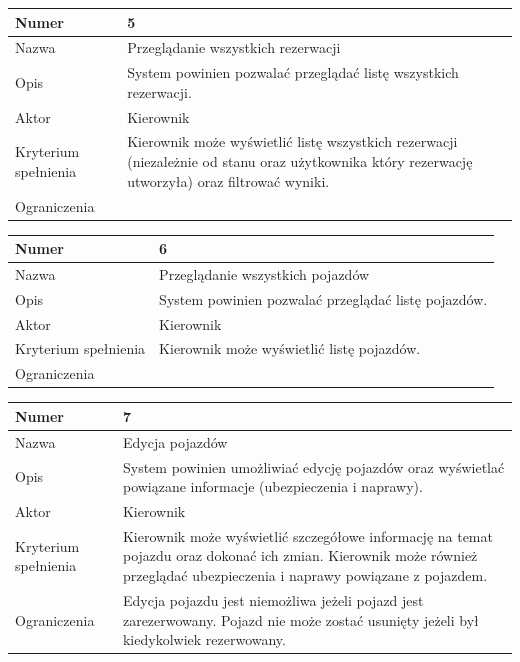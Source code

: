 \documentclass[eng,printmode,openany]{mgr}
\begin{document}
	\begin{table}[H]
		\begin{tabularx}{\textwidth}{|l|X|}
			\hline
			Numer                & 5  \\ \hline
			Nazwa                & Przeglądanie wszystkich rezerwacji \\ \hline
			Opis                 & System powinien pozwalać przeglądać listę wszystkich rezerwacji. \\ \hline
			Aktor                & Kierownik \\ \hline
			Kryterium spełnienia & Kierownik może wyświetlić listę wszystkich rezerwacji (niezależnie od stanu oraz użytkownika który rezerwację utworzyła) oraz filtrować wyniki. \\ \hline
			Ograniczenia         &  \\ \hline
		\end{tabularx}
	\end{table}	

	\begin{table}[H]
		\begin{tabularx}{\textwidth}{|l|X|}
			\hline
			Numer                & 6  \\ \hline
			Nazwa                & Przeglądanie wszystkich pojazdów \\ \hline
			Opis                 & System powinien pozwalać przeglądać listę pojazdów. \\ \hline
			Aktor                & Kierownik \\ \hline
			Kryterium spełnienia & Kierownik może wyświetlić listę pojazdów. \\ \hline
			Ograniczenia         &  \\ \hline
		\end{tabularx}
	\end{table}	

	\begin{table}[H]
		\begin{tabularx}{\textwidth}{|l|X|}
			\hline
			Numer                & 7  \\ \hline
			Nazwa                & Edycja pojazdów \\ \hline
			Opis                 & System powinien umożliwiać edycję pojazdów oraz wyświetlać powiązane informacje (ubezpieczenia i naprawy). \\ \hline
			Aktor                & Kierownik \\ \hline
			Kryterium spełnienia & Kierownik może wyświetlić szczegółowe informację na temat pojazdu oraz dokonać ich zmian. Kierownik może również przeglądać ubezpieczenia i naprawy powiązane z pojazdem. \\ \hline
			Ograniczenia         & Edycja pojazdu jest niemożliwa jeżeli pojazd jest zarezerwowany. Pojazd nie może zostać usunięty jeżeli był kiedykolwiek rezerwowany. \\ \hline
		\end{tabularx}
	\end{table}	
\end{document}

